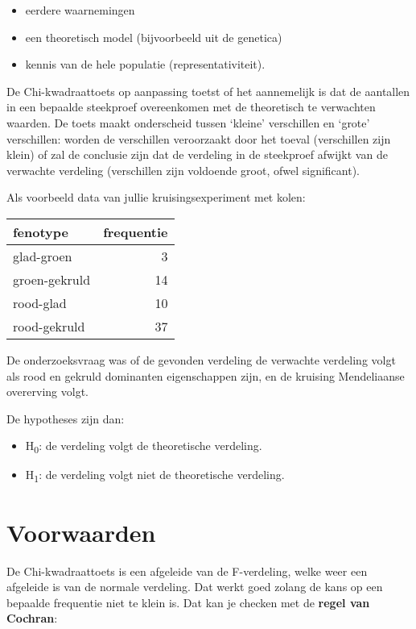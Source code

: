 \documentclass[]{book}
\providecommand{\tightlist}{%
  \setlength{\itemsep}{0pt}\setlength{\parskip}{0pt}}
\theoremstyle{definition}
\theoremstyle{definition}
\theoremstyle{definition}
\theoremstyle{remark}
\begin{document}
\begin{itemize}
\tightlist
\item
  eerdere waarnemingen
\item
  een theoretisch model (bijvoorbeeld uit de genetica)
\item
  kennis van de hele populatie (representativiteit).
\end{itemize}

De Chi-kwadraattoets op aanpassing toetst of het aannemelijk is dat de
aantallen in een bepaalde steekproef overeenkomen met de theoretisch te
verwachten waarden. De toets maakt onderscheid tussen `kleine'
verschillen en `grote' verschillen: worden de verschillen veroorzaakt
door het toeval (verschillen zijn klein) of zal de conclusie zijn dat de
verdeling in de steekproef afwijkt van de verwachte verdeling
(verschillen zijn voldoende groot, ofwel significant).

Als voorbeeld data van jullie kruisingsexperiment met kolen:

\begin{tabular}{l|r}
\hline
fenotype & frequentie\\
\hline
glad-groen & 3\\
\hline
groen-gekruld & 14\\
\hline
rood-glad & 10\\
\hline
rood-gekruld & 37\\
\hline
\end{tabular}

De onderzoeksvraag was of de gevonden verdeling de verwachte verdeling
volgt als rood en gekruld dominanten eigenschappen zijn, en de kruising
Mendeliaanse overerving volgt.

De hypotheses zijn dan:

\begin{itemize}
\tightlist
\item
  H\textsubscript{0}: de verdeling volgt de theoretische verdeling.
\item
  H\textsubscript{1}: de verdeling volgt niet de theoretische verdeling.
\end{itemize}

\section{Voorwaarden}\label{voorwaarden}

De Chi-kwadraattoets is een afgeleide van de F-verdeling, welke weer een
afgeleide is van de normale verdeling. Dat werkt goed zolang de kans op
een bepaalde frequentie niet te klein is. Dat kan je checken met de
\textbf{regel van Cochran}:
\end{document}

